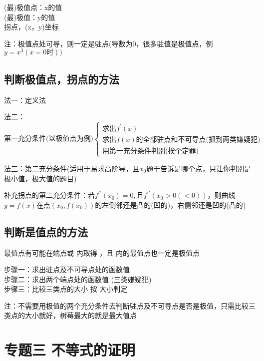 \documentclass[a4paper,11pt]{book}
\begin{document}
\begin{center}
(最)极值点：x的值\\
(最)极值：y的值\\
拐点，(x，y)坐标
\end{center}


注：极值点处可导，则一定是驻点(导数为0，很多驻值是极值点，例$y=x^{3}(x=0\text{时}))$


\subsection*{判断极值点，拐点的方法}

法一：定义法

\vspace{3ex}

\noindent 法二：
\[
\text{第一充分条件(以极值点为例)}
\begin{cases}
    \text{求出}f^{\prime}(x)\\
    \text{求出}f(x)\text{的全部驻点和不可导点(抓到两类嫌疑犯)}\\
    \text{用第一充分条件判别(挨个定罪)}
\end{cases}
\]

\vspace{3ex}

\noindent 法三：第二充分条件(适用于易求高阶导，且$x_{0}$题干告诉是哪个点，只让你判别是极小值，极大值的题目)

补充拐点的第二充分条件：若$f^{\prime\prime}(x_{0})=0,且f^{\prime\prime}(x_{0}>0(<0))$，则曲线$y=f(x)$在点$(x_{0},f(x_{0}))$的左侧邻还是凸的(凹的)，右侧邻还是凹的(凸的)


\subsection*{判断是值点的方法}

最值点有可能在端点或   内取得 ，且   内的最值点也一定是极值点

步骤一：求出驻点及不可导点处的函数值\\
\noindent 步骤二：求出两个端点处的函数值   \quad    (三类嫌疑犯)\\
\noindent 步骤三：比较三类点的大小 \quad 按 大小判定

注：不需要用极值的两个充分条件去判断驻点及不可导点是否是极值，只需比较三类点的大小就好，树莓最大的就是最大值点

\section*{专题三 \quad 不等式的证明}
\end{document}
